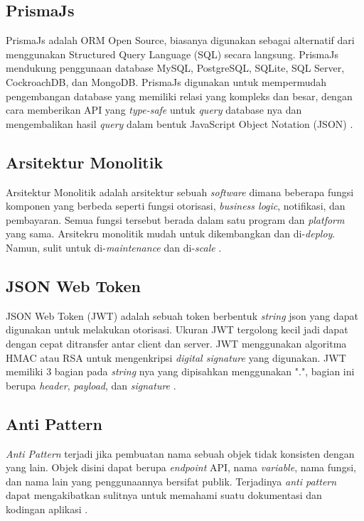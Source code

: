 \subsection{PrismaJs}
PrismaJs adalah ORM Open Source, biasanya digunakan sebagai alternatif dari menggunakan Structured Query Language (SQL) secara langsung. PrismaJs mendukung penggunaan database MySQL, PostgreSQL, SQLite, SQL Server, CockroachDB, dan MongoDB. PrismaJs digunakan untuk mempermudah pengembangan database yang memiliki relasi yang kompleks dan besar, dengan cara memberikan API yang \textit{type-safe} untuk \textit{query} database nya dan mengembalikan hasil \textit{query} dalam bentuk JavaScript Object Notation (JSON) \cite{Prisma}.

\subsection{Arsitektur Monolitik}
Arsitektur Monolitik adalah arsitektur sebuah \textit{software} dimana beberapa fungsi komponen yang berbeda seperti fungsi otorisasi, \textit{business logic}, notifikasi, dan pembayaran. Semua fungsi tersebut berada dalam satu program dan \textit{platform} yang sama. Arsitekru monolitik mudah untuk dikembangkan dan di-\textit{deploy}. Namun, sulit untuk di-\textit{maintenance} dan di-\textit{scale} \cite{gos2020comparison}. 


\subsection{JSON Web Token}
JSON Web Token (JWT) adalah sebuah token berbentuk \textit{string} json yang dapat digunakan untuk melakukan otorisasi. Ukuran JWT tergolong kecil jadi dapat dengan cepat ditransfer antar client dan server. JWT menggunakan algoritma HMAC atau RSA untuk mengenkripsi \textit{digital signature} yang digunakan. JWT memiliki 3 bagian pada \textit{string} nya yang dipisahkan menggunakan ".", bagian ini berupa \textit{header}, \textit{payload}, dan \textit{signature} \cite{rahmatullo2019stateless}.

\subsection{Anti Pattern}
\textit{Anti Pattern} terjadi jika pembuatan nama sebuah objek tidak konsisten dengan yang lain. Objek disini dapat berupa \textit{endpoint} API, nama \textit{variable}, nama fungsi, dan nama lain yang penggunaannya bersifat publik. Terjadinya \textit{anti pattern} dapat mengakibatkan sulitnya untuk memahami suatu dokumentasi dan kodingan aplikasi \cite{Aghajani2018} \cite{Alshraiedeh2021}.


